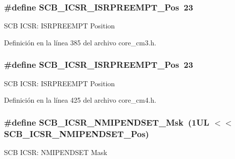 \subsubsection[{\texorpdfstring{S\+C\+B\+\_\+\+I\+C\+S\+R\+\_\+\+I\+S\+R\+P\+R\+E\+E\+M\+P\+T\+\_\+\+Pos}{SCB_ICSR_ISRPREEMPT_Pos}}]{\setlength{\rightskip}{0pt plus 5cm}\#define S\+C\+B\+\_\+\+I\+C\+S\+R\+\_\+\+I\+S\+R\+P\+R\+E\+E\+M\+P\+T\+\_\+\+Pos~23}\hypertarget{group___c_m_s_i_s___s_c_b_ga11cb5b1f9ce167b81f31787a77e575df}{}\label{group___c_m_s_i_s___s_c_b_ga11cb5b1f9ce167b81f31787a77e575df}
S\+CB I\+C\+SR\+: I\+S\+R\+P\+R\+E\+E\+M\+PT Position 

Definición en la línea 385 del archivo core\+\_\+cm3.\+h.

\subsubsection[{\texorpdfstring{S\+C\+B\+\_\+\+I\+C\+S\+R\+\_\+\+I\+S\+R\+P\+R\+E\+E\+M\+P\+T\+\_\+\+Pos}{SCB_ICSR_ISRPREEMPT_Pos}}]{\setlength{\rightskip}{0pt plus 5cm}\#define S\+C\+B\+\_\+\+I\+C\+S\+R\+\_\+\+I\+S\+R\+P\+R\+E\+E\+M\+P\+T\+\_\+\+Pos~23}\hypertarget{group___c_m_s_i_s___s_c_b_ga11cb5b1f9ce167b81f31787a77e575df}{}\label{group___c_m_s_i_s___s_c_b_ga11cb5b1f9ce167b81f31787a77e575df}
S\+CB I\+C\+SR\+: I\+S\+R\+P\+R\+E\+E\+M\+PT Position 

Definición en la línea 425 del archivo core\+\_\+cm4.\+h.

\subsubsection[{\texorpdfstring{S\+C\+B\+\_\+\+I\+C\+S\+R\+\_\+\+N\+M\+I\+P\+E\+N\+D\+S\+E\+T\+\_\+\+Msk}{SCB_ICSR_NMIPENDSET_Msk}}]{\setlength{\rightskip}{0pt plus 5cm}\#define S\+C\+B\+\_\+\+I\+C\+S\+R\+\_\+\+N\+M\+I\+P\+E\+N\+D\+S\+E\+T\+\_\+\+Msk~(1\+U\+L $<$$<$ S\+C\+B\+\_\+\+I\+C\+S\+R\+\_\+\+N\+M\+I\+P\+E\+N\+D\+S\+E\+T\+\_\+\+Pos)}\hypertarget{group___c_m_s_i_s___s_c_b_ga340e3f79e9c3607dee9f2c048b6b22e8}{}\label{group___c_m_s_i_s___s_c_b_ga340e3f79e9c3607dee9f2c048b6b22e8}
S\+CB I\+C\+SR\+: N\+M\+I\+P\+E\+N\+D\+S\+ET Mask 


